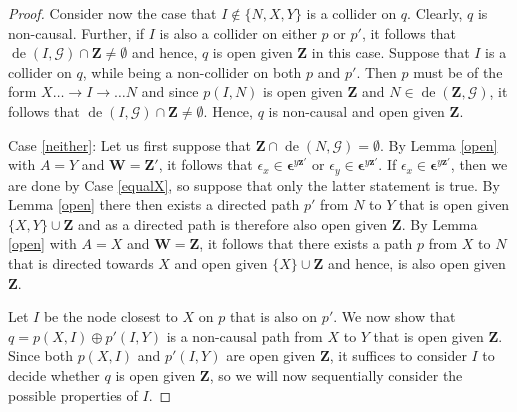 \documentclass[11pt,a4paper]{article}
\theoremstyle{definition}
\theoremstyle{remark}
\DeclareMathOperator{\de}{de}
\newcommand{\g}[1][G]{\mathcal{#1}}
\begin{document}
\begin{proof}
	 
	 

	
	Consider now the case that $I \notin \{N,X,Y\}$ is a collider on $q$. 
	Clearly, $q$ is non-causal. Further, if $I$ is also a collider on either $p$ or $p'$, it follows that $\de(I, \g) \cap \mathbf{Z} \neq \emptyset$ and hence, $q$ is open given $\mathbf{Z}$ in this case. Suppose that $I$ is a collider on $q$, while being a non-collider on both $p$ and $p'$. 
	Then $p$ must be of the form $X \dots 
	\rightarrow I \rightarrow \dots N$ and since $p(I,N)$ is open given $\mathbf{Z}$ and $N \in \de(\mathbf{Z},\g)$, it follows that $\de(I, \g) \cap \mathbf{Z} \neq \emptyset$. Hence, $q$ is non-causal and open given $\mathbf{Z}$. 
	
	Case \ref{neither}: 
	Let us first suppose that $\mathbf{Z} \cap \de(N,\g) = \emptyset$. By Lemma \ref{open} with $A=Y$ and $\mathbf{W} = \mathbf{Z'}$, it follows that $\epsilon_x \in \boldsymbol{\epsilon}^{y\mathbf{z'}}$ or $\epsilon_y \in \boldsymbol{\epsilon}^{y\mathbf{z'}}$.  
	If $\epsilon_x \in \boldsymbol{\epsilon}^{y\mathbf{z'}}$, then we are done by Case \ref{equalX}, so suppose that only the latter statement is true. By Lemma \ref{open} there then exists a directed path $p'$ from $N$ to $Y$ that is open given $\{X,Y\} \cup \mathbf{Z}$ and as a directed path is therefore also open given $\mathbf{Z}$. 
	By Lemma \ref{open} with $A=X$ and $\mathbf{W} = \mathbf{Z}$, it follows that there exists a path $p$ from $X$ to $N$ that is directed towards $X$ and open given $\{X\} \cup \mathbf{Z}$ and hence, is also open given $\mathbf{Z}$. 
	
	Let $I$ be the node closest to $X$ on $p$ that is also on $p'$. We now show that $q=p(X,I) \oplus p'(I,Y)$ is a non-causal path from $X$ to $Y$ that is open given $\mathbf{Z}$.
	Since both $p(X,I)$ and $p'(I,Y)$ are open given $\mathbf{Z}$, it suffices to consider $I$ to decide whether $q$ is open given $\mathbf{Z}$, so we will now sequentially consider the possible properties of $I$. 
	

\end{proof}
\end{document}
